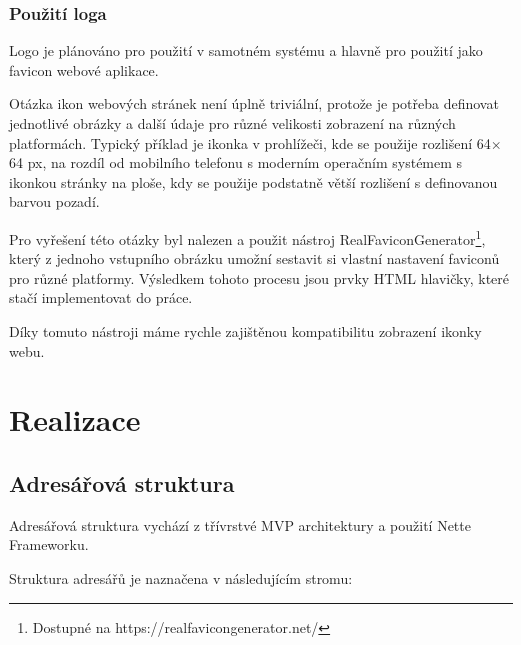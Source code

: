 \documentclass[czech,BP]{thesiskiv}
\begin{document}
	\subsection{Použití loga}
	\par Logo je plánováno pro použití v samotném systému a hlavně pro použití jako favicon webové aplikace.
	\par Otázka ikon webových stránek není úplně triviální, protože je potřeba definovat jednotlivé obrázky a další údaje pro různé velikosti zobrazení na různých platformách. Typický příklad je ikonka v prohlížeči, kde se použije rozlišení 64$\times$64 px, na rozdíl od mobilního telefonu s moderním operačním systémem s ikonkou stránky na ploše, kdy se použije podstatně větší rozlišení s definovanou barvou pozadí.
	\par Pro vyřešení této otázky byl nalezen a použit nástroj RealFaviconGenerator\footnote{Dostupné na https://realfavicongenerator.net/}, který z jednoho vstupního obrázku umožní sestavit si vlastní nastavení faviconů pro různé platformy. Výsledkem tohoto procesu jsou prvky HTML hlavičky, které stačí implementovat do práce. 
	\par Díky tomuto nástroji máme rychle zajištěnou kompatibilitu zobrazení ikonky webu.
\chapter{Realizace}
	\section{Adresářová struktura}
	\par Adresářová struktura vychází z třívrstvé MVP architektury a  použití Nette Frameworku.
	\par Struktura adresářů je naznačena v následujícím stromu:
\end{document}
